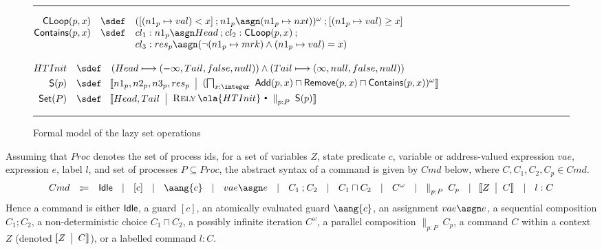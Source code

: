 \documentclass{article}
\makeatletter
\def \hasgn{\asgn}
\newcommand{\AG}[1]{\aang{#1}}
\newcommand{\Idle}{{\sf Idle}}
\newcommand{\st}{~{\scriptscriptstyle ^\bullet}~}
\def\figrule{\rule{\columnwidth}{0.5pt}}
\def \rely {\mathop{\textsc{Rely}}}
\theoremstyle{plain}
\theoremstyle{definition}
\def \llb {\llbracket}
\def \rrb {\rrbracket}
\def\abssynt{\mathop{:\joinrel:\joinrel=}}
\newcommand{\Context}[2]
{\!\llb #1 
    \begin{array}[c]{@{~~}|@{~~}l@{}}
      #2
    \end{array}\rrb } \newcommand{\Var}[2]{\textsc{Var}~#1 \st #2}
\newcommand{\Par}{\textstyle\mathop{\|}}
\def\ch{\mathbin{;}}
\makeatother
\begin{document}
\begin{figure}[!t]
  \centering
  \figrule \small

  $\begin{array}{@{}rcl@{}}
\mathsf{CLoop}(p,x) & \sdef &  ([(n1_p\mapsto val)< x]
    \ch n1_p \asgn (n1_p\mapsto nxt))^\omega \ch 
    {[}(n1_p\mapsto val) \geq x{]}
     \\
    \mathsf{Contains}(p,x) & \sdef &
    \begin{array}[t]{@{}l@{}}
      cl_1: n1_p \asgn Head \ch cl_2:  \mathsf{CLoop}(p,x) \ch {} \\
      cl_3: res_p \asgn (\neg
      (n1_p\mapsto mrk) \land 
      (n1_p\mapsto val) = x)\\
\end{array}
  \end{array}$
  \smallskip
  
  $\begin{array}[t]{@{}rcl@{}} 
    HTInit & \sdef & (Head \longmapsto (-\infty, Tail, false, null))
    \land (Tail \longmapsto
    (\infty, null, false, null))
    \smallskip \\
    \mathsf{S}(p) & \sdef & 
    \Context{n1_p,n2_p,n3_p,res_p}{(\bigsqcap_{x : \integer}\
      \mathsf{Add}(p,x) \sqcap \mathsf{Remove}(p,x) \sqcap
      \mathsf{Contains}(p,x))^\omega}
    \smallskip\\
    \mathsf{Set}(P) & \sdef & \Context{Head, Tail}{\rely \ola{HTInit}
      \st \Par_{p:P}\ \mathsf{S}(p)}
  \end{array}$
  \figrule
  \caption{Formal model of the lazy set operations}
  \label{fig:formal-lazyset}
\end{figure}



Assuming that $Proc$ denotes the set of process ids, for a set of
variables $Z$, state predicate $c$, variable or address-valued
expression $vae$, expression $e$, label $l$, and set of processes $P
\subseteq Proc$, the abstract syntax of a command is given by $Cmd$
below, where $C, C_1, C_2, C_p \in Cmd$.
$$
\begin{array}[t]{@{}rcl@{}}
  Cmd & \abssynt & 
  \begin{array}[t]{@{}l@{}}
\Idle ~~\mid ~~ [c] ~~\mid~~ \AG{c} ~~\mid~~
    vae \hasgn e ~~ \mid~~
    C_1 \ch C_2 ~~\mid~~ 
    C_1 \sqcap C_2
    ~~\mid~~  
    C^\omega 
    ~~\mid~~ \Par_{p:P}\ C_p 
    ~~\mid~~ \Context{Z}{C} ~~\mid~~ l : C 
  \end{array}
\end{array}$$
Hence a command is either $\Idle$, a
guard $[c]$, an atomically evaluated guard $\AG{c}$, an assignment $vae \asgn e$, a
sequential composition $C_1 \ch 
C_2$, a non-deterministic choice $C_1 \sqcap C_2$, a possibly infinite
iteration $C^\omega$, a parallel composition $\Par_{p:P}\ C_p $, a
command $C$ within a context $Z$ (denoted $\Context{Z}{C}$), or a labelled 
command $l : C$. 
\end{document}
